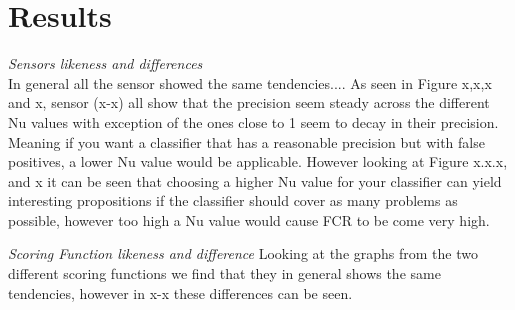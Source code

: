 \section{Results}
\textit{Sensors likeness and differences}\\
In general all the sensor showed the same tendencies....
As seen in Figure x,x,x and x, sensor (x-x) all show that the precision seem steady across the different Nu values with exception of the ones close to 1 seem to decay in their precision. Meaning if you want a classifier that has a reasonable precision but with false positives, a lower Nu value would be applicable.
However looking at Figure x.x.x, and x it can be seen that choosing a higher Nu value for your classifier can yield interesting propositions if the classifier should cover as many problems as possible, however too high a Nu value would cause FCR to be come very high.


\textit{Scoring Function likeness and difference}
Looking at the graphs from the two different scoring functions we find that they in general shows the same tendencies, however in x-x these differences can be seen. 
